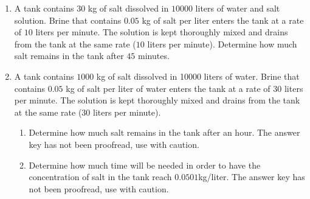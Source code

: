\begin{multicols}{2}
\begin{enumerate} [ref={\fcProblemRef}]
\item \label{problemDFQseparable-mixing-problem-1}
A tank contains $30$ kg of salt dissolved in $10000$ liters of water and salt solution. Brine that contains $0.05$ kg of salt per liter enters the tank at a rate of $10$ liters per minute. The solution is kept thoroughly mixed and drains from the tank at the same rate ($10$ liters per minute). Determine how much salt remains in the tank after $45$ minutes.

\item A tank contains $1000$ kg of salt dissolved in 10000 liters of water. Brine that contains $0.05$ kg of salt per liter of water enters the tank at a rate of $30$ liters per minute. The solution is kept thoroughly mixed and drains from the tank at the same rate ($30$ liters per minute). 

\begin{enumerate}
\item Determine how much salt remains in the tank after an hour. The answer key has not been proofread, use with caution.

\item Determine how much time will be needed in order to have the concentration of salt in the tank reach $0.0501$kg/liter. The answer key has not been proofread, use with caution.

\end{enumerate}
\end{enumerate}
\end{multicols}